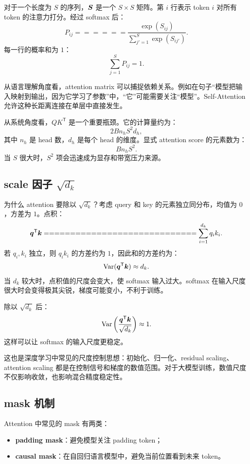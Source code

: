 对于一个长度为 $S$ 的序列，$\bm{S}$ 是一个 $S\times S$ 矩阵。第 $i$ 行表示 token $i$ 对所有 token 的注意力打分。经过 softmax 后：
\[
P_{ij}
======

\frac{\exp(S_{ij})}{\sum_{j'=1}^{S}\exp(S_{ij'})}.
\]
每一行的概率和为 $1$：
\[
\sum_{j=1}^{S}P_{ij}=1.
\]

从语言理解角度看，attention matrix 可以捕捉依赖关系。例如在句子“模型把输入映射到输出，因为它学习了参数”中，“它”可能需要关注“模型”。Self-Attention 允许这种长距离连接在单层中直接发生。

从系统角度看，$QK^{\mathsf{T}}$ 是一个重要瓶颈。它的计算量约为：
\[
2B n_h S^2 d_h,
\]
其中 $n_h$ 是 head 数，$d_h$ 是每个 head 的维度。显式 attention score 的元素数为：
\[
B n_h S^2.
\]
当 $S$ 很大时，$S^2$ 项会迅速成为显存和带宽压力来源。

\subsection{scale 因子 $\sqrt{d_k}$}
\label{subsec:attention-scale-factor}

为什么 attention 要除以 $\sqrt{d_k}$？考虑 query 和 key 的元素独立同分布，均值为 $0$，方差为 $1$。点积：
\[
\vect{q}^{\mathsf{T}}\vect{k}
=============================

\sum_{i=1}^{d_k}q_i k_i.
\]
若 $q_i,k_i$ 独立，则 $q_i k_i$ 的方差约为 $1$，因此和的方差约为：
\[
\operatorname{Var}(\bm{q}^{\mathsf{T}}\bm{k})\approx d_k.
\]
当 $d_k$ 较大时，点积值的尺度会变大，使 softmax 输入过大。softmax 在输入尺度很大时会变得极其尖锐，梯度可能变小，不利于训练。

除以 $\sqrt{d_k}$ 后：
\[
\operatorname{Var}
\left(
\frac{\bm{q}^{\mathsf{T}}\bm{k}}{\sqrt{d_k}}
\right)
\approx 1.
\]
这样可以让 softmax 的输入尺度更稳定。

这也是深度学习中常见的尺度控制思想：初始化、归一化、residual scaling、attention scaling 都是在控制信号和梯度的数值范围。对于大模型训练，数值尺度不仅影响收敛，也影响混合精度稳定性。

\subsection{mask 机制}
\label{subsec:attention-mask}

Attention 中常见的 mask 有两类：

\begin{itemize}
\item \textbf{padding mask}：避免模型关注 padding token；
\item \textbf{causal mask}：在自回归语言模型中，避免当前位置看到未来 token。
\end{itemize}

